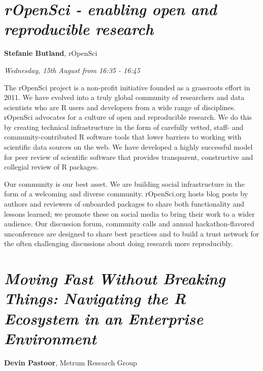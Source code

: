 \documentclass[]{book}
\theoremstyle{definition}
\theoremstyle{definition}
\theoremstyle{definition}
\theoremstyle{remark}
\begin{document}
\hypertarget{ropensci---enabling-open-and-reproducible-research-1}{%
\section{\texorpdfstring{\emph{rOpenSci - enabling open and reproducible
research}}{rOpenSci - enabling open and reproducible research}}\label{ropensci---enabling-open-and-reproducible-research-1}}

\textbf{Stefanie Butland}, rOpenSci

\emph{Wednesday, 15th August from 16:35 - 16:45}

The rOpenSci project is a non-profit initiative founded as a grassroots
effort in 2011. We have evolved into a truly global community of
researchers and data scientists who are R users and developers from a
wide range of disciplines. rOpenSci advocates for a culture of open and
reproducible research. We do this by creating technical infrastructure
in the form of carefully vetted, staff- and community-contributed R
software tools that lower barriers to working with scientific data
sources on the web. We have developed a highly successful model for peer
review of scientific software that provides transparent, constructive
and collegial review of R packages.

Our community is our best asset. We are building social infrastructure
in the form of a welcoming and diverse community. rOpenSci.org hosts
blog posts by authors and reviewers of onboarded packages to share both
functionality and lessons learned; we promote these on social media to
bring their work to a wider audience. Our discussion forum, community
calls and annual hackathon-flavored unconference are designed to share
best practices and to build a trust network for the often challenging
discussions about doing research more reproducibly.

\hypertarget{moving-fast-without-breaking-things-navigating-the-r-ecosystem-in-an-enterprise-environment-1}{%
\section{\texorpdfstring{\emph{Moving Fast Without Breaking Things:
Navigating the R Ecosystem in an Enterprise
Environment}}{Moving Fast Without Breaking Things: Navigating the R Ecosystem in an Enterprise Environment}}\label{moving-fast-without-breaking-things-navigating-the-r-ecosystem-in-an-enterprise-environment-1}}

\textbf{Devin Pastoor}, Metrum Research Group
\end{document}
